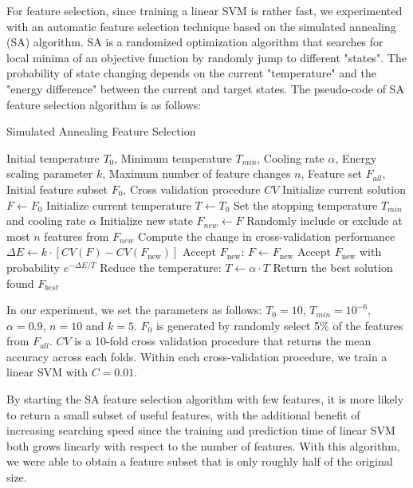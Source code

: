 \documentclass[12pt,a4paper]{article}
\begin{document}
For feature selection, since training a linear SVM is rather fast, we experimented with an automatic feature selection technique based on the simulated annealing (SA) algorithm. SA is a randomized optimization algorithm that searches for local minima of an objective function by randomly jump to different "states". The probability of state changing depends on the current "temperature" and the "energy difference" between the current and target states. The pseudo-code of SA feature selection algorithm is as follows:

\begin{algorithm}
\caption{Simulated Annealing Feature Selection}
\begin{algorithmic}[1]
\Require Initial temperature $T_0$, Minimum temperature $T_{min}$, Cooling rate $\alpha$, Energy scaling parameter $k$, Maximum number of feature changes $n$, Feature set $F_{all}$, Initial feature subset $F_0$, Cross validation procedure $CV$
\Ensure
\State Initialize current solution $F \gets F_0$
\State Initialize current temperature $T \gets T_0$
\State Set the stopping temperature $T_{min}$ and cooling rate $\alpha$
    \State Initialize new state $F_{new} \gets F$
    \State Randomly include or exclude at most $n$ features from $F_{new}$
    \State Compute the change in cross-validation performance $\Delta E \gets k \cdot [CV(F) - CV(F_{\text{new}})]$
        \State Accept $F_{\text{new}}$: $F \gets F_{\text{new}}$
    \Else
        \State Accept $F_{\text{new}}$ with probability $e^{-\Delta E / T}$
    \EndIf
    \State Reduce the temperature: $T \gets \alpha \cdot T$
\EndWhile
\State Return the best solution found $F_{best}$
\end{algorithmic}
\end{algorithm}

In our experiment, we set the parameters as follows: \(T_0=10\), \(T_{min}=10^{-6}\), \(\alpha=0.9\), \(n=10\) and \(k=5\). \(F_0\) is generated by randomly select 5\% of the features from \(F_{all}\). \(CV\) is a 10-fold cross validation procedure that returns the mean accuracy across each folds. Within each cross-validation procedure, we train a linear SVM with \(C=0.01\).

By starting the SA feature selection algorithm  with few features, it is more likely to return a small subset of useful features, with the additional benefit of increasing searching speed since the training and prediction time of linear SVM both grows linearly with respect to the number of features. With this algorithm, we were able to obtain a feature subset that is only roughly half of the original size.
\end{document}
